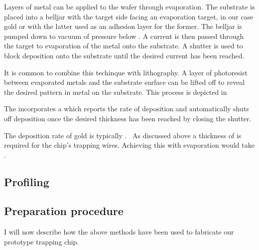 Layers of metal can be applied to the wafer through evaporation. The substrate
is placed into a belljar 
with the target side facing an evaporation target, in our case gold or
 with the latter used as an adhesion layer for the former. The
belljar is pumped down to vacuum of pressure below . A current is then
passed through the target to  evaporation of the metal onto the
substrate. A shutter is used to block deposition onto the substrate until the
desired current has been reached.

It is common to combine this techinque with lithography. A layer of photoresist
between evaporated metals and the substrate surface can be lifted off to reveal
the desired pattern in metal on the substrate.  This process is
depicted in 

\begin{figure}
  \caption{}
  \label{fab:fig:photolith}
\end{figure}


The  incorporates a  which reports the rate of
deposition and automatically shuts off deposition once the desired thickness
has been reached by closing the shutter. 

The deposition rate of gold is typically .~\cite{} As discussed above 
a thickness of  is required for the chip's trapping wires. Achieving
this with evaporation would take . 


\subsection{Profiling}
\label{fab:prep:profiling}


\subsection{Preparation procedure}
\label{fab:prep:procedure}

I will now describe how the above methods have been used to fabricate our
prototype trapping chip.

